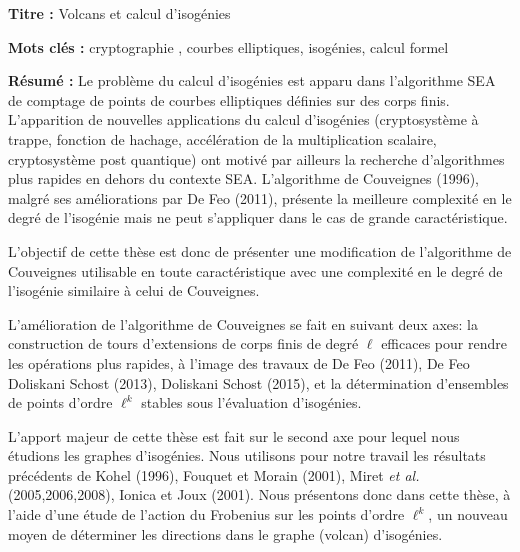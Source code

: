 \documentclass[a4paper, titlepage, 11pt]{book}
\newcommand{\titre}{Volcans et calcul d'isogénies}
\begin{document}
\begin{breakbox}

\noindent\textbf{Titre : }\titre

\vspace{2ex}

\noindent\textbf{Mots clés : }cryptographie , courbes elliptiques, isogénies, 
calcul formel

\begin{multicols}{2}
\noindent\textbf{Résumé : }
Le problème du calcul d'isogénies est apparu dans l'algorithme SEA de comptage
de points de courbes elliptiques définies sur des corps finis. L'apparition de 
nouvelles applications du calcul d'isogénies (cryptosystème à trappe, fonction 
de hachage, accélération de la multiplication scalaire, cryptosystème post 
quantique) ont motivé par ailleurs la recherche d'algorithmes plus rapides en 
dehors du contexte SEA. L'algorithme de Couveignes (1996), malgré ses 
améliorations par De Feo (2011), présente la meilleure complexité en le 
degré de l'isogénie mais ne peut s'appliquer dans le cas de grande 
caractéristique.

L'objectif de cette thèse est donc de présenter une modification de 
l'algorithme de Couveignes utilisable en toute caractéristique avec une 
complexité en le degré de l'isogénie similaire à celui de Couveignes.

L'amélioration de l'algorithme de Couveignes se fait en 
suivant deux axes: la construction de tours d'extensions de corps finis
de degré $\ell$ efficaces pour rendre les opérations plus rapides, à l'image 
des travaux de De Feo (2011), De Feo Doliskani Schost (2013), Doliskani 
Schost (2015), et la détermination d'ensembles de points d'ordre 
$\ell^k$ stables sous l'évaluation d'isogénies.

L'apport majeur de cette thèse est fait sur le second axe pour lequel nous 
étudions les graphes d'isogénies. Nous utilisons
pour notre travail les résultats précédents de Kohel (1996), Fouquet et Morain
(2001), Miret \emph{et al.} (2005,2006,2008), Ionica et Joux (2001). Nous 
présentons donc dans cette thèse, à l'aide d'une étude de l'action du Frobenius
sur les points d'ordre $\ell^k$, un nouveau moyen de déterminer les directions 
dans le graphe (volcan) d'isogénies.



\end{multicols}
\end{breakbox}
\end{document}
